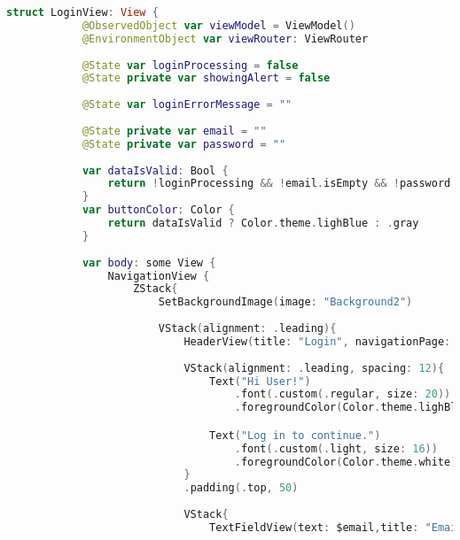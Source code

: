 \hspace{-10mm}
\begin{minipage}{\textwidth}
    \linespread{0.8}\selectfont
    \begin{lstlisting}[language=swift]
        struct LoginView: View {
            @ObservedObject var viewModel = ViewModel()
            @EnvironmentObject var viewRouter: ViewRouter
            
            @State var loginProcessing = false
            @State private var showingAlert = false
            
            @State var loginErrorMessage = ""
            
            @State private var email = ""
            @State private var password = ""
            
            var dataIsValid: Bool {
                return !loginProcessing && !email.isEmpty && !password.isEmpty
            }
            var buttonColor: Color {
                return dataIsValid ? Color.theme.lighBlue : .gray
            }
    
            var body: some View {
                NavigationView {
                    ZStack{
                        SetBackgroundImage(image: "Background2")
                        
                        VStack(alignment: .leading){
                            HeaderView(title: "Login", navigationPage: .welcomePage, arrowVisibility: true)
                        
                            VStack(alignment: .leading, spacing: 12){
                                Text("Hi User!")
                                    .font(.custom(.regular, size: 20))
                                    .foregroundColor(Color.theme.lighBlue)

                                Text("Log in to continue.")
                                    .font(.custom(.light, size: 16))
                                    .foregroundColor(Color.theme.white)
                            }
                            .padding(.top, 50)
                            
                            VStack{
                                TextFieldView(text: $email,title: "Email")
                                

\end{lstlisting}
\end{minipage}
